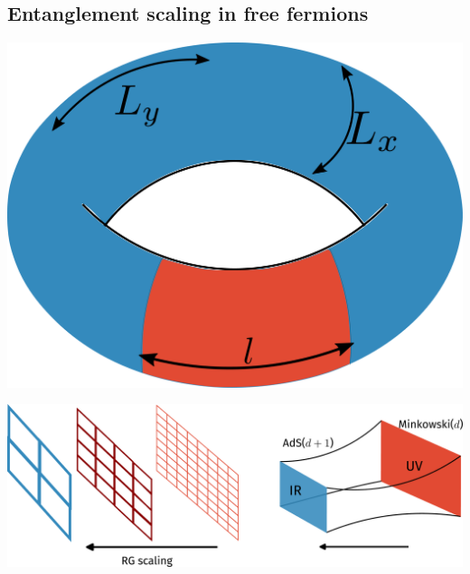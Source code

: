 \documentclass[10pt,aspectratio=169]{beamer}
\begin{document}
\begin{frame}{}
\section{Entanglement scaling in free fermions}

\hspace*{-10pt}
\begin{minipage}{0.2\textwidth}
\includegraphics[width=\textwidth]{figures/subsystem-torus.pdf}
\end{minipage}
\hspace*{\fill}
\begin{minipage}{0.7\textwidth}
\includegraphics[width=\textwidth]{figures/holography.pdf}
\end{minipage}
\hspace*{-10pt}
\end{frame}
\end{document}
